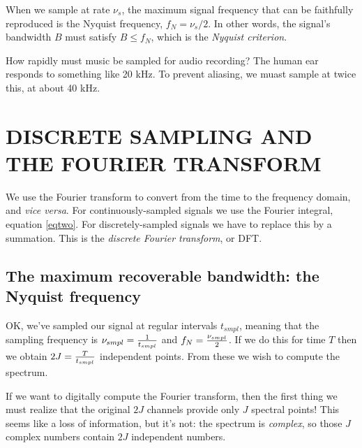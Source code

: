 \documentclass[11pt,preprint]{aastex}
\begin{document}
When we sample at rate $\nu_{s}$, the
maximum signal frequency that can be faithfully reproduced is
the Nyquist frequency,
$f_N = \nu_{s} / 2$.  In other words, the signal's
bandwidth $B$ must satisfy $B \le f_N$, which is the {\it Nyquist criterion}.

How rapidly must music be sampled for audio recording? The
human ear responds to something like 20 kHz.  To prevent aliasing, we
muast sample at twice this, at about 40 kHz. 

%

\section{DISCRETE SAMPLING AND THE FOURIER TRANSFORM}

          We use the Fourier transform to convert from the time to the
frequency domain, and {\it vice versa}.  For continuously-sampled
signals we use the Fourier integral, equation \ref{eqtwo}. For
discretely-sampled signals we have to replace this by a summation.  This
is the {\it discrete Fourier transform}, or DFT. 

\subsection {The maximum recoverable bandwidth: the Nyquist frequency}

         OK, we've sampled our signal at regular intervals $t_{smpl}$,
meaning that the sampling frequency is $\nu_{smpl} = {1 \over t_{smpl}}$
and $f_N = {\nu_{smpl} \over 2}$. If we do this for time $T$ then we
obtain $2J = {T \over t_{smpl}}$ independent points. From these we wish
to compute the spectrum.

	If we want to digitally compute the Fourier transform, then the
first thing we  must realize that the original $2J$ channels provide
only $J$ spectral points! This seems like a loss of information, but
it's not: the spectrum is {\it complex}, so those $J$ complex numbers
contain $2J$ independent numbers. 
\end{document}
